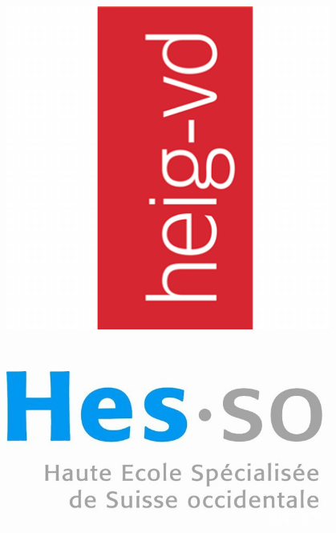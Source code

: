 \begin{titlepage}

\begin{minipage}{0.4\textwidth}
\begin{flushleft}
\includegraphics[width=0.8\textwidth]{pageGarde/logo}~
\end{flushleft}
\end{minipage} 
~
\begin{minipage}{0.4\textwidth}
\begin{flushright}
\includegraphics[width=0.8\textwidth]{pageGarde/logo_hes}~
\end{flushright}
\end{minipage}\\[3cm]

\begin{center}

\textsc{\Large\theCours} \\[0.2cm]
{\large\theAcro} \\[1cm]
\HRule \\[0.5cm]
\textsc{\huge \thetitle} \\[0.3cm]
\HRule \\[1cm]
{\large\theauthor} \\[2cm]
\end{center}


\end{titlepage}
